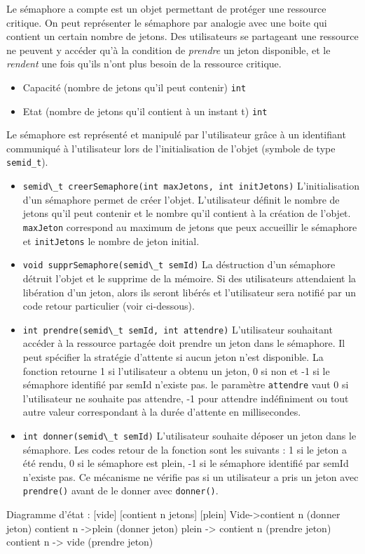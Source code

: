 {
Le sémaphore a compte est un objet permettant de protéger une ressource
critique. On peut représenter le sémaphore par analogie avec une boite qui
contient un certain nombre de jetons. Des utilisateurs se partageant une
ressource ne peuvent y accéder qu'à la condition de \emph{prendre} un jeton
disponible, et le \emph{rendent} une fois qu'ils n'ont plus besoin de la
ressource critique.
}
{
\begin{itemize}
	\item Capacité (nombre de jetons qu'il peut contenir) \lstinline{int}
	\item Etat (nombre de jetons qu'il contient à un instant t) \lstinline{int}
\end{itemize}

Le sémaphore est représenté et manipulé par l'utilisateur grâce à un
identifiant communiqué à l'utilisateur lors de l'initialisation de l'objet
(symbole de type \texttt{semid\_t}).
}
{
\begin{itemize}
	\item \lstinline{semid\_t creerSemaphore(int maxJetons, int initJetons)}
L'initialisation d'un sémaphore permet de créer l'objet. L'utilisateur définit
le nombre de jetons qu'il peut contenir et le nombre qu'il contient à la
création de l'objet. \texttt{maxJeton} correspond au maximum de jetons que peux
accueillir le sémaphore et \texttt{initJetons} le nombre de jeton initial.
	\item \lstinline{void supprSemaphore(semid\_t semId)} La déstruction d'un
sémaphore détruit l'objet et le supprime de la mémoire. Si des utilisateurs
attendaient la libération d'un jeton, alors ils seront libérés et l'utilisateur
sera notifié par un code retour particulier (voir ci-dessous).
	\item \lstinline{int prendre(semid\_t semId, int attendre)} L'utilisateur
souhaitant accéder à la ressource partagée doit prendre un jeton dans le
sémaphore. Il peut spécifier la stratégie d'attente si aucun jeton n'est
disponible. La fonction retourne 1 si l'utilisateur a obtenu un jeton, 0 si non
et -1 si le sémaphore identifié par semId n'existe pas. le paramètre
\texttt{attendre} vaut 0 si l'utilisateur ne souhaite pas attendre, -1 pour
attendre indéfiniment ou tout autre valeur correspondant à la durée d'attente
en millisecondes.
	\item \lstinline{int donner(semid\_t semId)} L'utilisateur souhaite
déposer un jeton dans le sémaphore. Les codes retour de la fonction sont les
suivants : 1 si le jeton a été rendu, 0 si le sémaphore est plein, -1 si le
sémaphore identifié par semId n'existe pas. Ce mécanisme ne vérifie pas si un
utilisateur a pris un jeton avec \texttt{prendre()} avant de le donner avec
\texttt{donner()}.
\end{itemize}
}

Diagramme d'état :
[vide]    [contient n jetons]     [plein]
  Vide->contient n (donner jeton)
  contient n ->plein (donner jeton)
  plein -> contient n (prendre jeton)
  contient n -> vide (prendre jeton)
